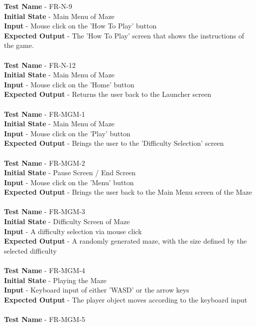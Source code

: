 \documentclass[12pt, titlepage]{article}
\begin{document}
\textbf{Test Name} - FR-N-9\\
\textbf{Initial State} - Main Menu of Maze\\
\textbf{Input} - Mouse click on the 'How To Play' button\\
\textbf{Expected Output} - The 'How To Play' screen that shows the instructions of the game.\\ \\
\textbf{Test Name} - FR-N-12\\
\textbf{Initial State} - Main Menu of Maze\\
\textbf{Input} - Mouse click on the 'Home' button\\
\textbf{Expected Output} - Returns the user back to the Launcher screen\\ \\
\textbf{Test Name} - FR-MGM-1\\
\textbf{Initial State} - Main Menu of Maze\\
\textbf{Input} - Mouse click on the 'Play' button\\
\textbf{Expected Output} - Brings the user to the 'Difficulty Selection' screen\\ \\
\textbf{Test Name} - FR-MGM-2\\
\textbf{Initial State} - Pause Screen / End Screen\\
\textbf{Input} - Mouse click on the 'Menu' button\\
\textbf{Expected Output} - Brings the user back to the Main Menu screen of the Maze \\ \\
\textbf{Test Name} - FR-MGM-3\\
\textbf{Initial State} - Difficulty Screen of Maze\\
\textbf{Input} - A difficulty selection via mouse click\\
\textbf{Expected Output} - A randomly generated maze, with the size defined by the selected difficulty\\ \\ 
\textbf{Test Name} - FR-MGM-4\\
\textbf{Initial State} - Playing the Maze\\
\textbf{Input} - Keyboard input of either 'WASD' or the arrow keys\\
\textbf{Expected Output} - The player object moves according to the keyboard input\\ \\ 
\textbf{Test Name} - FR-MGM-5\\
\end{document}
